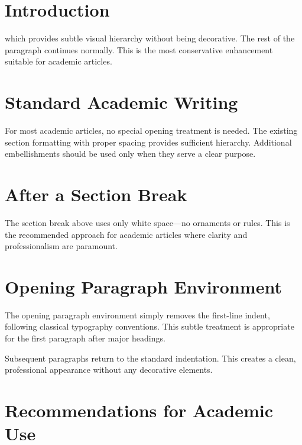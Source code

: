 \documentclass[11pt]{article}
\begin{document}
\section{Introduction}

 which provides subtle visual hierarchy without being decorative. The rest of the paragraph continues normally. This is the most conservative enhancement suitable for academic articles.

\lipsum[1]

\section{Standard Academic Writing}

For most academic articles, no special opening treatment is needed. The existing section formatting with proper spacing provides sufficient hierarchy. Additional embellishments should be used only when they serve a clear purpose.

\lipsum[2]

\sectionbreak

\section{After a Section Break}

The section break above uses only white space—no ornaments or rules. This is the recommended approach for academic articles where clarity and professionalism are paramount.

\lipsum[3]

\section{Opening Paragraph Environment}

\begin{openingparagraph}
The opening paragraph environment simply removes the first-line indent, following classical typography conventions. This subtle treatment is appropriate for the first paragraph after major headings.
\end{openingparagraph}

Subsequent paragraphs return to the standard indentation. This creates a clean, professional appearance without any decorative elements.

\section{Recommendations for Academic Use}
\end{document}
